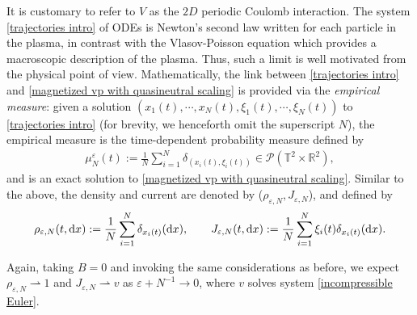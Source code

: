 \documentclass[11pt,reqno]{amsart}
\numberwithin{equation}{section}
\def\dd{{\rm d}}
\begin{document}
It is customary to refer to $V$ as the $2D$ periodic Coulomb interaction. 
The system \eqref{trajectories intro} of ODEs is Newton's second law written for each particle in the plasma, in contrast with the Vlasov-Poisson equation which provides a macroscopic description of the plasma. 
Thus, such a limit is well motivated from the physical point of view. Mathematically, the link between \eqref{trajectories intro} and \eqref{magnetized vp with quasineutral scaling} is provided via the \textit{empirical measure}: 
given a solution $(x_{1}(t),\cdots\!,x_{N}(t),\xi_{1}(t),\cdots\!,\xi_{N}(t))$ to \eqref{trajectories intro} (for brevity, we henceforth omit the superscript $N$), 
the empirical measure is the time-dependent probability measure defined by   
\begin{align*}
\mu_{N}^{\varepsilon}(t):=\frac{1}{N}\sum_{i=1}^{N}\delta_{(x_{i}(t),\xi_{i}(t))}\in \mathcal{P}(\mathbb{T}^{2}\times \mathbb{R}^{2}),  
\end{align*}
and is an exact solution to \eqref{magnetized vp with quasineutral scaling}. Similar to the above, the density and current are denoted by ($\rho_{\varepsilon,N},J_{\varepsilon,N}$), and defined by  
\begin{align}
\rho_{\varepsilon,N}(t,\dd x):=\frac{1}{N}\sum_{i=1}^{N}\delta_{x_{i}(t)}(\dd x),\qquad
J_{\varepsilon,N}(t,\dd x):=\frac{1}{N}\sum_{i=1}^{N}\xi_{i}(t)\delta_{x_{i}(t)}(\dd x).\label{discrete density and current}    
\end{align}

Again, taking $B=0$ and invoking the same considerations as before, we expect
$\rho_{\varepsilon,N}\rightharpoonup1$ and $J_{\varepsilon,N}\rightharpoonup v$
as $\varepsilon+N^{-1}\to0$, where $v$ solves system \eqref{incompressible Euler}.
\end{document}

